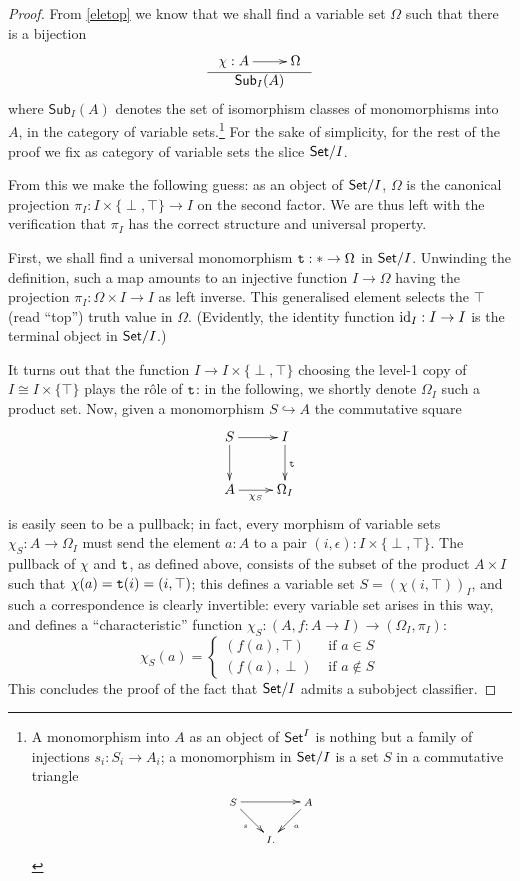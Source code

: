 \begin{proof}
	From \autoref{eletop} we know that we shall find a variable set $\Omega$ such that there is a bijection
	\[\begin{array}{c}
			\xymatrix{ \chi : A \ar[r] & \Omega} \\ \hline
			\textsf{Sub}_I(A)
		\end{array}\]
	where $\textsf{Sub}_I(A)$ denotes the set of isomorphism classes of monomorphisms into $A$, in the category of variable sets.\footnote{A monomorphism into $A$ as an object of $\mathsf{Set}^I$ is nothing but a family of injections $s_i : S_i \to A_i$; a monomorphism in $\mathsf{Set}/I$ is a set $S$ in a commutative triangle
	\[\scriptsize
		\xymatrix@!=1mm{S\ar[rr]\ar[dr]_s && A\ar[dl]^a \\ &I.&}\]}
	For the sake of simplicity, for the rest of the proof we fix as category of variable sets the slice $\mathsf{Set}/I$.

	From this we make the following guess: as an object of $\mathsf{Set}/I$, $\Omega$ is the canonical projection $\pi_I : I\times \{\perp,\top\} \to I$ on the second factor. We are thus left with the verification that $\pi_I$ has the correct structure and universal property.

	First, we shall find a universal monomorphism $\texttt{t} : * \to \Omega$ in $\mathsf{Set}/I$. Unwinding the definition, such a map amounts to an injective function $I\to \Omega$ having the projection $\pi_I : \Omega \times I \to I$ as left inverse. This generalised element selects the $\top$ (read ``top'') truth value in $\Omega$. (Evidently, the identity function $\text{id}_I : I \to I$ is the terminal object in $\mathsf{Set}/I$.)

	It turns out that the function $I \to I\times \{\perp,\top\}$ choosing the level-1 copy of $I\cong I\times \{\top\}$ plays the r\^ole of $\texttt{t}$: in the following, we shortly denote $\Omega_I$ such a product set. Now, given a monomorphism $S \hookrightarrow A$ the commutative square
	\[
		\vcenter{\xymatrix{
		S\ar[d]\ar[r] & I \ar[d]^{\true}\\
		A \ar[r]_-{\chi_S} & \Omega_I
		}}
	\]
	is easily seen to be a pullback; in fact, every morphism of variable sets $\chi_S : A \to \Omega_I$ must send the element $a : A$ to a pair $(i,\epsilon) : I\times \{\perp,\top\}$. The pullback of $\chi$ and $\texttt{t}$, as defined above, consists of the subset of the product $A\times I$ such that $\chi(a)=\texttt{t}(i)=(i,\top)$; this defines a variable set $S=(\chi(i,\top))_I$, and such a correspondence is clearly invertible: every variable set arises in this way, and defines a ``characteristic'' function $\chi_S : (A,f : A \to I) \to (\Omega_I,\pi_I)$:
	\[\chi_S(a) =
		\begin{cases}
			(f(a), \top)  & \text{ if } a\in S    \\
			(f(a), \perp) & \text{ if } a\notin S
		\end{cases}\]
	This concludes the proof of the fact that $\mathsf{Set}/I$ admits a subobject classifier.
\end{proof}

